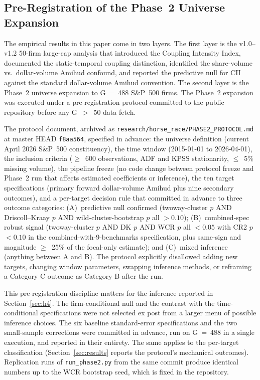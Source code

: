 \documentclass[preprint,12pt,authoryear]{elsarticle}
\begin{document}
\subsection{Pre-Registration of the Phase~2 Universe Expansion}
\label{sec:preregistration}

The empirical results in this paper come in two layers. The first layer is the v1.0--v1.2 50-firm large-cap analysis that introduced the Coupling Intensity Index, documented the static-temporal coupling distinction, identified the share-volume vs.\ dollar-volume Amihud confound, and reported the predictive null for CII against the standard dollar-volume Amihud convention. The second layer is the Phase~2 universe expansion to G~=~488 S\&P~500 firms. The Phase~2 expansion was executed under a pre-registration protocol committed to the public repository before any G~$>$~50 data fetch.

The protocol document, archived as \texttt{research/horse\_race/PHASE2\_PROTOCOL.md} at master HEAD \texttt{f8aa564}, specified in advance: the universe definition (current April 2026 S\&P~500 constituency), the time window (2015-01-01 to 2026-04-01), the inclusion criteria ($\geq$~600 observations, ADF and KPSS stationarity, $\leq$~5\% missing volume), the pipeline freeze (no code change between protocol freeze and Phase~2 run that affects estimated coefficients or inference), the ten target specifications (primary forward dollar-volume Amihud plus nine secondary outcomes), and a per-target decision rule that committed in advance to three outcome categories: (A)~predictive null confirmed (twoway-cluster $p$ AND Driscoll--Kraay $p$ AND wild-cluster-bootstrap $p$ all $> 0.10$); (B)~combined-spec robust signal (twoway-cluster $p$ AND DK $p$ AND WCR $p$ all $< 0.05$ with CR2 $p$ $< 0.10$ in the combined-with-9-benchmarks specification, plus same-sign and magnitude $\geq$~25\% of the focal-only estimate); and (C)~mixed inference (anything between A and B). The protocol explicitly disallowed adding new targets, changing window parameters, swapping inference methods, or reframing a Category C outcome as Category B after the run.

This pre-registration discipline matters for the inference reported in Section~\ref{sec:h4}. The firm-conditional null and the contrast with the time-conditional specifications were not selected ex post from a larger menu of possible inference choices. The six baseline standard-error specifications and the two small-sample corrections were committed in advance, run on G~=~488 in a single execution, and reported in their entirety. The same applies to the per-target classification (Section~\ref{sec:results} reports the protocol's mechanical outcomes). Replication runs of \texttt{run\_phase2.py} from the same commit produce identical numbers up to the WCR bootstrap seed, which is fixed in the repository.
\end{document}
